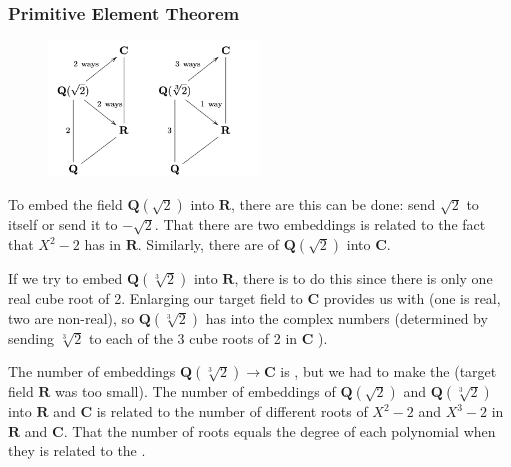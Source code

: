 \documentclass{article}
\begin{document}
\subsubsection{Primitive Element Theorem}
\begin{figure}[h]
\centering
\includegraphics[width=0.5\textwidth]{Figs/4.png}
\end{figure}

\begin{exma}
To embed the field $\mathbf{Q}(\sqrt{2})$ into $\mathbf{R}$, there are  this can be done: send $\sqrt{2}$ to itself or send it to $-\sqrt{2}$. That there are two embeddings is related to the fact that $X^{2}-2$ has  in $\mathbf{R}$. 
Similarly, there are  of $\mathbf{Q}(\sqrt{2})$ into $\mathbf{C}$. 

If we try to embed $\mathbf{Q}(\sqrt[3]{2})$ into $\mathbf{R}$, there is  to do this since there is only one real cube root of 2. Enlarging our target field to $\mathbf{C}$ provides us with  (one is real, two are non-real), so $\mathbf{Q}(\sqrt[3]{2})$ has  into the complex numbers (determined by sending $\sqrt[3]{2}$ to each of the 3 cube roots of 2 in $\mathbf{C}$ ).

The number of embeddings $\mathbf{Q}(\sqrt[3]{2}) \rightarrow \mathbf{C}$ is , but we had to make the  (target field $\mathbf{R}$ was too small). The number of embeddings of $\mathbf{Q}(\sqrt{2})$ and $\mathbf{Q}(\sqrt[3]{2})$ into $\mathbf{R}$ and $\mathbf{C}$ is related to the number of different roots of $X^{2}-2$ and $X^{3}-2$ in $\mathbf{R}$ and $\mathbf{C}$. That the number of roots equals the degree of each polynomial when they  is related to the .
\end{exma}
\end{document}
